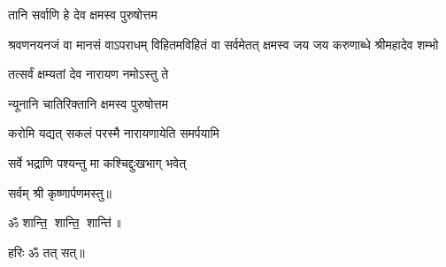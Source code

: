 
\clearpage
{}
{तानि सर्वाणि हे देव क्षमस्व पुरुषोत्तम}

{श्रवणनयनजं वा मानसं वाऽपराधम्}
{विहितमविहितं वा सर्वमेतत् क्षमस्व}
{जय जय करुणाब्धे श्रीमहादेव शम्भो}

{तत्सर्वं क्षम्यतां देव नारायण नमोऽस्तु ते}

{न्यूनानि चातिरिक्तानि क्षमस्व पुरुषोत्तम}

{करोमि यद्यत् सकलं परस्मै नारायणायेति समर्पयामि}

{सर्वे भद्राणि पश्यन्तु मा कश्चिद्दुःखभाग् भवेत्}
\centerline{सर्वम् श्री कृष्णार्पणमस्तु॥}
\centerline{ॐ शान्ति॒ शान्ति॒ शान्ति॑॥}
\centerline{हरिः ॐ तत् सत्॥}

\closesection